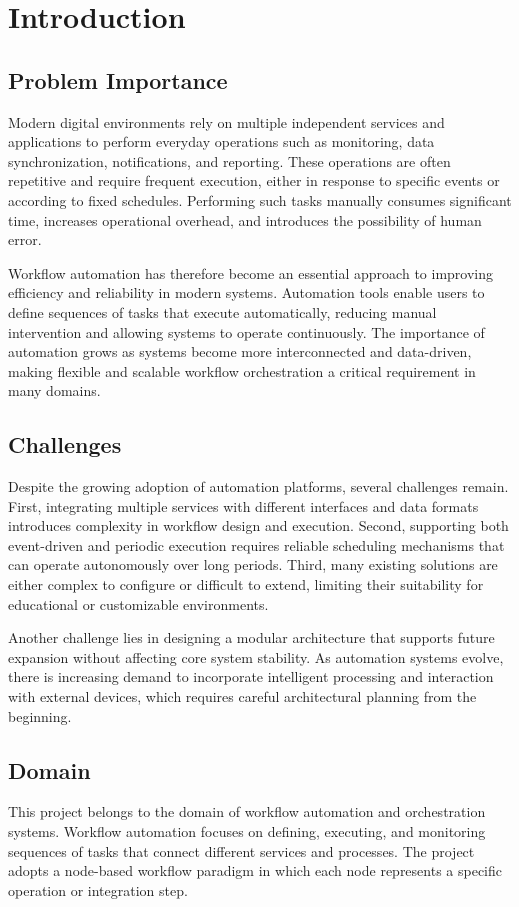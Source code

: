 \chapter{Introduction}

\section{Problem Importance}
Modern digital environments rely on multiple independent services and applications to perform everyday operations such as monitoring, data synchronization, notifications, and reporting. These operations are often repetitive and require frequent execution, either in response to specific events or according to fixed schedules. Performing such tasks manually consumes significant time, increases operational overhead, and introduces the possibility of human error.

Workflow automation has therefore become an essential approach to improving efficiency and reliability in modern systems. Automation tools enable users to define sequences of tasks that execute automatically, reducing manual intervention and allowing systems to operate continuously. The importance of automation grows as systems become more interconnected and data-driven, making flexible and scalable workflow orchestration a critical requirement in many domains.

\section{Challenges}
Despite the growing adoption of automation platforms, several challenges remain. First, integrating multiple services with different interfaces and data formats introduces complexity in workflow design and execution. Second, supporting both event-driven and periodic execution requires reliable scheduling mechanisms that can operate autonomously over long periods. Third, many existing solutions are either complex to configure or difficult to extend, limiting their suitability for educational or customizable environments.

Another challenge lies in designing a modular architecture that supports future expansion without affecting core system stability. As automation systems evolve, there is increasing demand to incorporate intelligent processing and interaction with external devices, which requires careful architectural planning from the beginning.

\section{Domain}
This project belongs to the domain of workflow automation and orchestration systems. Workflow automation focuses on defining, executing, and monitoring sequences of tasks that connect different services and processes. The project adopts a node-based workflow paradigm in which each node represents a specific operation or integration step.

